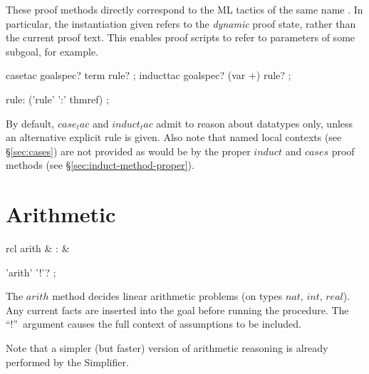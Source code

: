 These proof methods directly correspond to the ML tactics of the same name
\cite{isabelle-HOL}.  In particular, the instantiation given refers to the
\emph{dynamic} proof state, rather than the current proof text.  This enables
proof scripts to refer to parameters of some subgoal, for example.


\begin{rail}
  casetac goalspec? term rule?
  ;
  inducttac goalspec? (var +) rule?
  ;

  rule: ('rule' ':' thmref)
  ;
\end{rail}

By default, $case_tac$ and $induct_tac$ admit to reason about datatypes only,
unless an alternative explicit rule is given.  Also note that named local
contexts (see \S\ref{sec:cases}) are not provided as would be by the proper
$induct$ and $cases$ proof methods (see \S\ref{sec:induct-method-proper}).


\section{Arithmetic}

\begin{matharray}{rcl}
  arith & : & \isarmeth \\
\end{matharray}

\begin{rail}
  'arith' '!'?
  ;
\end{rail}

The $arith$ method decides linear arithmetic problems (on types $nat$, $int$,
$real$).  Any current facts are inserted into the goal before running the
procedure.  The ``!''~argument causes the full context of assumptions to be
included.

Note that a simpler (but faster) version of arithmetic reasoning is already
performed by the Simplifier.


